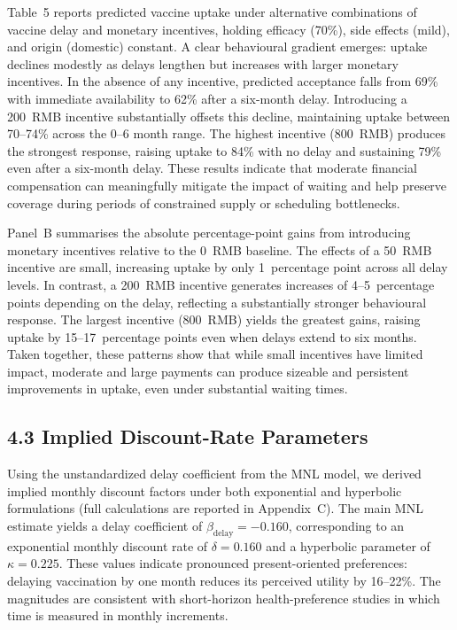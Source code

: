 \documentclass[12pt]{article}
\begin{document}
\clearpage

\clearpage


\clearpage
Table~5 reports predicted vaccine uptake under alternative combinations of vaccine delay and
monetary incentives, holding efficacy (70\%), side effects (mild), and origin (domestic)
constant. A clear behavioural gradient emerges: uptake declines modestly as delays
lengthen but increases with larger monetary incentives. In the absence of any incentive,
predicted acceptance falls from 69\% with immediate availability to 62\% after a six-month
delay. Introducing a 200~RMB incentive substantially offsets this decline, maintaining
uptake between 70--74\% across the 0--6 month range. The highest incentive (800~RMB)
produces the strongest response, raising uptake to 84\% with no delay and sustaining 79\%
even after a six-month delay. These results indicate that moderate financial compensation can
meaningfully mitigate the impact of waiting and help preserve coverage during periods of
constrained supply or scheduling bottlenecks.

Panel~B summarises the absolute percentage-point gains from introducing monetary incentives
relative to the 0~RMB baseline. The effects of a 50~RMB incentive are small, increasing
uptake by only 1~percentage point across all delay levels. In contrast, a 200~RMB incentive
generates increases of 4--5~percentage points depending on the delay, reflecting a
substantially stronger behavioural response. The largest incentive (800~RMB) yields the
greatest gains, raising uptake by 15--17~percentage points even when delays extend to six
months. Taken together, these patterns show that while small incentives have limited impact,
moderate and large payments can produce sizeable and persistent improvements in uptake,
even under substantial waiting times.


\clearpage

\clearpage
\subsection*{4.3 Implied Discount-Rate Parameters}

Using the unstandardized delay coefficient from the MNL model, we derived implied monthly 
discount factors under both exponential and hyperbolic formulations (full calculations are 
reported in Appendix~C). The main MNL estimate yields a delay coefficient of 
$\beta_{\text{delay}}=-0.160$, corresponding to an exponential monthly discount rate of 
$\delta = 0.160$ and a hyperbolic parameter of 
$\kappa = 0.225$. These values indicate pronounced present-oriented preferences: delaying 
vaccination by one month reduces its perceived utility by 16--22\%. The magnitudes are 
consistent with short-horizon health-preference studies in which time is measured in 
monthly increments.
\end{document}
